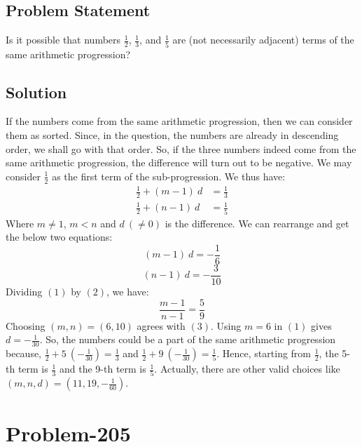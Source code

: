 \documentclass[12pt]{article}
\begin{document}
\subsection*{Problem Statement}
Is it possible that numbers $\frac{1}{2}$, $\frac{1}{3}$, and $\frac{1}{5}$ are (not necessarily adjacent) terms of the same arithmetic progression?

\subsection*{Solution}
If the numbers come from the same arithmetic progression, then we can consider them as sorted. Since, in the question, the numbers are already in descending order, we shall go with that order. So, if the three numbers indeed come from the same arithmetic progression, the difference will turn out to be negative. We may consider $\frac{1}{2}$ as the first term of the sub-progression. We thus have:
\begin{equation*}
\begin{aligned}
\frac{1}{2} + (m-1)\ d &= \frac{1}{3}\\
\frac{1}{2} + (n-1)\ d &= \frac{1}{5}
\end{aligned}
\end{equation*}
Where $m \neq 1$, $m < n$ and $d\ (\neq 0)$ is the difference. We can rearrange and get the below two equations:
\begin{equation}
		(m-1)\ d = -\frac{1}{6}	
\end{equation}
\begin{equation}
		(n-1)\ d = -\frac{3}{10}	
\end{equation}
Dividing $(1)$ by $(2)$, we have:
\begin{equation}
	\frac{m-1}{n-1} = \frac{5}{9}
\end{equation}
Choosing $(m, n) = (6, 10)$ agrees with $(3)$. Using $m=6$ in $(1)$ gives $d = -\frac{1}{30}$. So, the numbers could be a part of the same arithmetic progression because, $\frac{1}{2} + 5\ \left( -\frac{1}{30} \right) = \frac{1}{3}$ and $\frac{1}{2} + 9 \ \left( -\frac{1}{30} \right) = \frac{1}{5}$. Hence, starting from $\frac{1}{2}$, the 5-th term is $\frac{1}{3}$ and the 9-th term is $\frac{1}{5}$. Actually, there are other valid choices like $(m, n, d) = \left( 11, 19, -\frac{1}{60} \right)$.

\section*{Problem-205}
\end{document}
